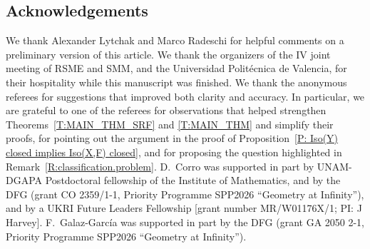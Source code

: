 \documentclass[10pt,a4paper]{amsart}
\numberwithin{equation}{section}
\theoremstyle{definition}
\begin{document}
\subsection*{Acknowledgements}
We thank Alexander Lytchak and Marco Radeschi for helpful comments on a preliminary version of this article. We thank the organizers of the IV joint meeting of RSME and SMM, and the Universidad Polit\'ecnica de Valencia, for their hospitality while this manuscript was finished. We thank the anonymous referees for suggestions that improved both clarity and accuracy. In particular, we are grateful to one of the referees for observations that helped strengthen Theorems~\ref{T:MAIN_THM_SRF} and \ref{T:MAIN_THM} and simplify their proofs, for pointing out the argument in the proof of Proposition~\ref{P: Iso(Y) closed implies Iso(X,F) closed}, and for proposing the question highlighted in Remark~\ref{R:classification.problem}.
D.~Corro was supported in part by UNAM-DGAPA Postdoctoral fellowship of the Institute of Mathematics, and by the DFG (grant CO 2359/1-1, Priority Programme SPP2026 ``Geometry at Infinity''), and by a UKRI Future Leaders Fellowship [grant number MR/W01176X/1; PI: J Harvey].
F.~Galaz-Garc\'ia was supported in part by the DFG (grant GA 2050 2-1, Priority Programme SPP2026 ``Geometry at Infinity'').
\end{document}
